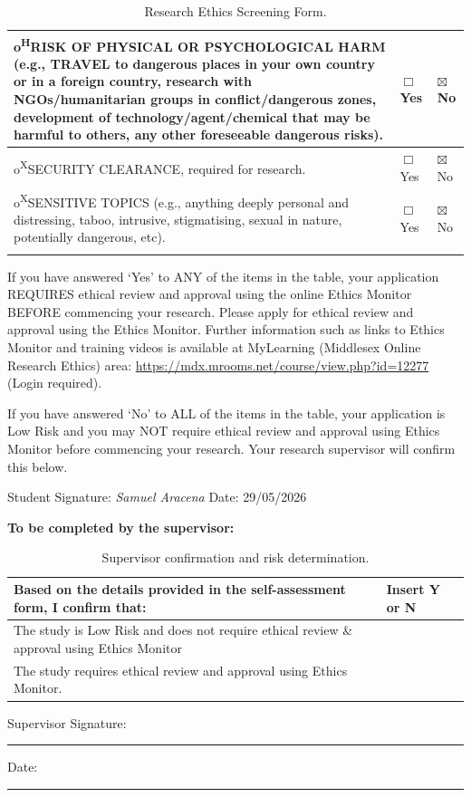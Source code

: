 \documentclass[12pt,a4paper]{article}
\begin{document}
\begin{longtable}{|p{10.3cm}|p{1.4cm}|p{1.4cm}|}
{\ttfamily o}\quad \textsuperscript{H}RISK OF PHYSICAL OR PSYCHOLOGICAL HARM (e.g., TRAVEL to dangerous places in your own country or in a foreign country, research with NGOs/humanitarian groups in conflict/dangerous zones, development of technology/agent/chemical that may be harmful to others, any other foreseeable dangerous risks). & $\Box$ Yes & $\boxtimes$ No \\ \hline
{\ttfamily o}\quad \textsuperscript{X}SECURITY CLEARANCE, required for research. & $\Box$ Yes & $\boxtimes$ No \\ \hline
{\ttfamily o}\quad \textsuperscript{X}SENSITIVE TOPICS (e.g., anything deeply personal and distressing, taboo, intrusive, stigmatising, sexual in nature, potentially dangerous, etc). & $\Box$ Yes & $\boxtimes$ No \\ \hline
\hline
\caption{Research Ethics Screening Form.} \label{tab:ethicsform} \\
\end{longtable}
\endgroup

\vspace{4pt}
\noindent If you have answered `Yes' to ANY of the items in the table, your application REQUIRES ethical review and approval using the online Ethics Monitor BEFORE commencing your research. Please apply for ethical review and approval using the Ethics Monitor. Further information such as links to Ethics Monitor and training videos is available at MyLearning (Middlesex Online Research Ethics) area: \url{https://mdx.mrooms.net/course/view.php?id=12277} (Login required).

\vspace{4pt}
\noindent If you have answered `No' to ALL of the items in the table, your application is Low Risk and you may NOT require ethical review and approval using Ethics Monitor before commencing your research. Your research supervisor will confirm this below.

\vspace{10pt}
\noindent Student Signature: \textit{Samuel Aracena} \qquad Date: 29/05/2026

\vspace{8pt}
\noindent\textbf{To be completed by the supervisor:}

\vspace{6pt}
\begingroup
\renewcommand{\arraystretch}{1.3}
\setlength{\intextsep}{0pt}
\setlength{\floatsep}{0pt}
\setlength{\textfloatsep}{0pt}
\setlength{\abovecaptionskip}{6pt}
\setlength{\belowcaptionskip}{6pt}
\begin{table}[h!]
\centering
\begin{tabular}{|p{10.5cm}|p{2.5cm}|}
\hline
\textbf{Based on the details provided in the self-assessment form, I confirm that:} & \textbf{Insert Y or N} \\
\hline
The study is Low Risk and does not require ethical review \& approval using Ethics Monitor & \\
\hline
The study requires ethical review and approval using Ethics Monitor. & \\
\hline
\end{tabular}
\caption{Supervisor confirmation and risk determination.}
\end{table}
\endgroup

\vspace{10pt}
\noindent Supervisor Signature: \rule{6cm}{0.4pt} \qquad Date: \rule{3cm}{0.4pt}
\end{document}
